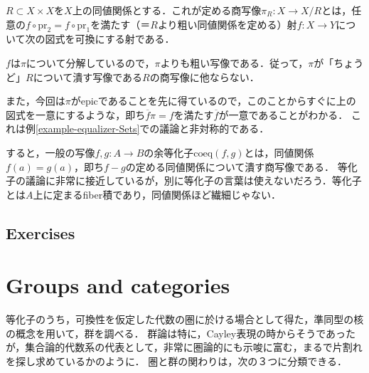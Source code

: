 \documentclass[uplatex, 12pt, dvipdfmx]{jsarticle}
\begin{document}
\begin{example}
    $R\subset X\times X$を$X$上の同値関係とする．これが定める商写像$\pi_R:X\to X/R$とは，任意の$f\circ\mathrm{pr}_2=f\circ\mathrm{pr}_1$を満たす（＝$R$より粗い同値関係を定める）射$f:X\to Y$について次の図式を可換にする射である．
    \begin{center}
    \end{center}
    $f$は$\pi$について分解しているので，$\pi$よりも粗い写像である．従って，$\pi$が「ちょうど」$R$について潰す写像である$R$の商写像に他ならない．

    また，今回は$\pi$がepicであることを先に得ているので，このことからすぐに上の図式を一意にするような，即ち$\overline{f}\pi=f$を満たす$\overline{f}$が一意であることがわかる．
    これは例\ref{example-equalizer-Sets}での議論と非対称的である．
\end{example}
\begin{remark*}
    すると，一般の写像$f,g:A\to B$の余等化子$\mathrm{coeq}(f,g)$とは，同値関係$f(a)=g(a)$，即ち$f-g$の定める同値関係について潰す商写像である．
    等化子の議論に非常に接近しているが，別に等化子の言葉は使えないだろう．等化子とは$A$上に定まるfiber積であり，同値関係ほど繊細じゃない．
\end{remark*}

\begin{example}[Top]
    
\end{example}

\begin{example}
    
\end{example}

\subsection{Exercises}

\section{Groups and categories}
等化子のうち，可換性を仮定した代数の圏に於ける場合として得た，準同型の核の概念を用いて，群を調べる．
群論は特に，Cayley表現の時からそうであったが，集合論的代数系の代表として，非常に圏論的にも示唆に富む，まるで片割れを探し求めているかのように．
圏と群の関わりは，次の３つに分類できる．
\end{document}
